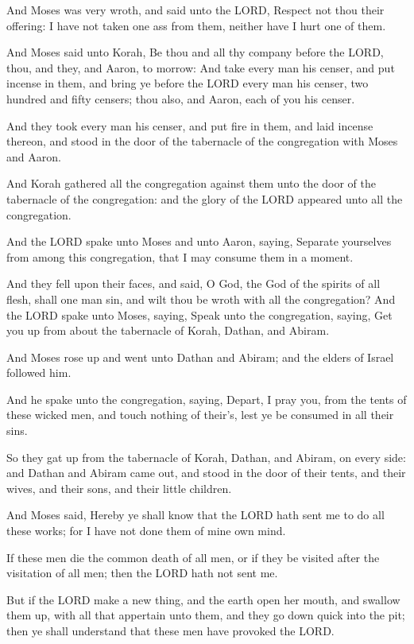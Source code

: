 \verse And Moses was very wroth, and said unto the LORD, Respect not
thou their offering: I have not taken one ass from them, neither have
I hurt one of them.

\verse And Moses said unto Korah, Be thou and all thy company before
the LORD, thou, and they, and Aaron, to morrow: \verse And take every
man his censer, and put incense in them, and bring ye before the LORD
every man his censer, two hundred and fifty censers; thou also, and
Aaron, each of you his censer.

\verse And they took every man his censer, and put fire in them, and
laid incense thereon, and stood in the door of the tabernacle of the
congregation with Moses and Aaron.

\verse And Korah gathered all the congregation against them unto the
door of the tabernacle of the congregation: and the glory of the LORD
appeared unto all the congregation.

\verse And the LORD spake unto Moses and unto Aaron, saying, \verse
Separate yourselves from among this congregation, that I may consume
them in a moment.

\verse And they fell upon their faces, and said, O God, the God of the
spirits of all flesh, shall one man sin, and wilt thou be wroth with
all the congregation?  \verse And the LORD spake unto Moses, saying,
\verse Speak unto the congregation, saying, Get you up from about the
tabernacle of Korah, Dathan, and Abiram.

\verse And Moses rose up and went unto Dathan and Abiram; and the
elders of Israel followed him.

\verse And he spake unto the congregation, saying, Depart, I pray you,
from the tents of these wicked men, and touch nothing of their's, lest
ye be consumed in all their sins.

\verse So they gat up from the tabernacle of Korah, Dathan, and Abiram,
on every side: and Dathan and Abiram came out, and stood in the door
of their tents, and their wives, and their sons, and their little
children.

\verse And Moses said, Hereby ye shall know that the LORD hath sent me
to do all these works; for I have not done them of mine own mind.

\verse If these men die the common death of all men, or if they be
visited after the visitation of all men; then the LORD hath not sent
me.

\verse But if the LORD make a new thing, and the earth open her mouth,
and swallow them up, with all that appertain unto them, and they go
down quick into the pit; then ye shall understand that these men have
provoked the LORD.

